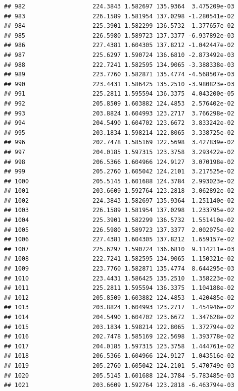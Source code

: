 \documentclass[
]{article}
\begin{document}
\begin{verbatim}
## 982                   224.3843 1.582697 135.9364  3.475209e-03
## 983                   226.1589 1.581954 137.0298 -1.280541e-02
## 984                   225.3901 1.582299 136.5732 -1.377657e-02
## 985                   226.5980 1.589723 137.3377 -6.937892e-03
## 986                   227.4381 1.604305 137.8212 -1.042447e-02
## 987                   225.6297 1.590724 136.6810 -2.873492e-03
## 988                   222.7241 1.582595 134.9065 -3.388338e-03
## 989                   223.7760 1.582871 135.4774 -4.568507e-03
## 990                   223.4431 1.586425 135.2510 -3.980823e-03
## 991                   225.2811 1.595594 136.3375  4.043200e-05
## 992                   205.8509 1.603882 124.4853  2.576402e-02
## 993                   203.8824 1.604993 123.2717  3.766298e-02
## 994                   204.5490 1.604702 123.6672  3.833242e-02
## 995                   203.1834 1.598214 122.8065  3.338725e-02
## 996                   202.7478 1.585169 122.5698  3.427839e-02
## 997                   204.0185 1.597315 123.3758  3.293422e-02
## 998                   206.5366 1.604966 124.9127  3.070198e-02
## 999                   205.2760 1.605042 124.2101  3.217525e-02
## 1000                  205.5145 1.601688 124.3784  2.993023e-02
## 1001                  203.6609 1.592764 123.2818  3.062892e-02
## 1002                  224.3843 1.582697 135.9364  1.251140e-02
## 1003                  226.1589 1.581954 137.0298  1.233795e-02
## 1004                  225.3901 1.582299 136.5732  1.551410e-02
## 1005                  226.5980 1.589723 137.3377  2.002075e-02
## 1006                  227.4381 1.604305 137.8212  1.659157e-02
## 1007                  225.6297 1.590724 136.6810  9.114211e-03
## 1008                  222.7241 1.582595 134.9065  1.150321e-02
## 1009                  223.7760 1.582871 135.4774  8.644295e-03
## 1010                  223.4431 1.586425 135.2510  1.358223e-02
## 1011                  225.2811 1.595594 136.3375  1.104188e-02
## 1012                  205.8509 1.603882 124.4853  1.420485e-02
## 1013                  203.8824 1.604993 123.2717  1.454946e-02
## 1014                  204.5490 1.604702 123.6672  1.347628e-02
## 1015                  203.1834 1.598214 122.8065  1.372794e-02
## 1016                  202.7478 1.585169 122.5698  1.393778e-02
## 1017                  204.0185 1.597315 123.3758  1.444761e-02
## 1018                  206.5366 1.604966 124.9127  1.043516e-02
## 1019                  205.2760 1.605042 124.2101  5.470749e-03
## 1020                  205.5145 1.601688 124.3784 -5.783485e-03
## 1021                  203.6609 1.592764 123.2818 -6.463794e-03

\end{verbatim}
\end{document}
